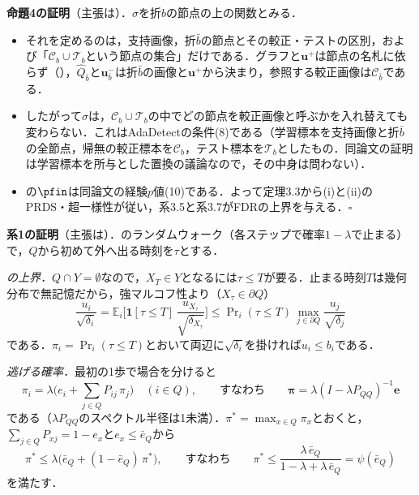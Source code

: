 \appblock
\textbf{命題4の証明}（主張は）．$\sigma$を折$b$の節点の上の関数とみる．
\begin{itemize}
\item[(1)] それを定めるのは，支持画像，折$\bar b$の節点とその較正・テストの区別，および「$\mathcal{C}_b\cup\mathcal{T}_b$という節点の集合」だけである．グラフと$\mathbf{u}^{+}$は節点の名札に依らず（），$\hat{Q}_{\bar b}$と$\mathbf{u}^{-}_{\bar b}$は折$\bar b$の画像と$\mathbf{u}^{+}$から決まり，参照する較正画像は$\mathcal{C}_{\bar b}$である．
\item[(2)] したがって$\sigma$は，$\mathcal{C}_b\cup\mathcal{T}_b$の中でどの節点を較正画像と呼ぶかを入れ替えても変わらない．これはAdaDetectの条件(8)である（学習標本を支持画像と折$\bar b$の全節点，帰無の較正標本を$\mathcal{C}_b$，テスト標本を$\mathcal{T}_b$としたもの．同論文の証明は学習標本を所与とした置換の議論なので，その中身は問わない）．
\item[(3)] の$\pfin$は同論文の経験$p$値(10)である．よって定理3.3から(i)と(ii)のPRDS・超一様性が従い，系3.5と系3.7がFDRの上界を与える．$\square$
\end{itemize}

\appblock
\textbf{系1の証明}（主張は）．のランダムウォーク（各ステップで確率$1-\lambda$で止まる）で，$Q$から初めて外へ出る時刻を$\tau$とする．

\textit{の上界．}$Q\cap Y=\emptyset$なので，$X_T\in Y$となるには$\tau\le T$が要る．止まる時刻$T$は幾何分布で無記憶だから，強マルコフ性より（$X_\tau\in\partial Q$）
\begin{equation*}
\frac{u_i}{\sqrt{\delta_i}}
=\mathbb{E}_i\Big[\mathbf{1}[\tau\le T]\,\frac{u_{X_\tau}}{\sqrt{\delta_{X_\tau}}}\Big]
\le\Pr\nolimits_i(\tau\le T)\,\max_{j\in\partial Q}\frac{u_j}{\sqrt{\delta_j}}
\end{equation*}
である．$\pi_i=\Pr_i(\tau\le T)$とおいて両辺に$\sqrt{\delta_i}$を掛ければ$u_i\le b_i$である．

\textit{逃げる確率．}最初の1歩で場合を分けると
\begin{equation*}
\pi_i=\lambda\Big(e_i+\sum_{j\in Q}P_{ij}\,\pi_j\Big)\quad(i\in Q),\qquad\text{すなわち}\qquad\boldsymbol{\pi}=\lambda(I-\lambda P_{QQ})^{-1}\mathbf{e}
\end{equation*}
である（$\lambda P_{QQ}$のスペクトル半径は1未満）．$\pi^{*}=\max_{x\in Q}\pi_x$とおくと，$\sum_{j\in Q}P_{xj}=1-e_x$と$e_x\le\bar e_Q$から
\begin{equation*}
\pi^{*}\le\lambda\big(\bar e_Q+(1-\bar e_Q)\,\pi^{*}\big),\qquad\text{すなわち}\qquad
\pi^{*}\le\frac{\lambda\,\bar e_Q}{1-\lambda+\lambda\,\bar e_Q}=\psi(\bar e_Q)
\end{equation*}
を満たす．


